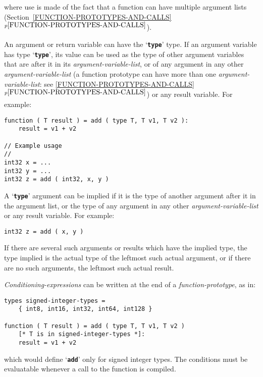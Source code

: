 \documentclass[12pt]{article}
\newcommand{\TT}[1]{{\tt \bfseries #1}}
\newcommand{\itemref}[1]{\ref{#1}$^{p\pageref{#1}}$}
\newenvironment{indpar}[1][0.3in]%
	{\begin{list}{}%
		     {\setlength{\itemsep}{0in}%
		      \setlength{\topsep}{0in}%
		      \setlength{\parsep}{1ex}%
		      \setlength{\labelwidth}{#1}%
		      \setlength{\leftmargin}{#1}%
		      \addtolength{\leftmargin}{\labelsep}}%
	 \item}%
	{\end{list}}
\begin{document}
where use is made of the fact that a function can have multiple
argument lists (Section~\itemref{FUNCTION-PROTOTYPES-AND-CALLS}).

An argument or return variable can have the `\TT{type}' type.
If an argument variable has type `\TT{type}', its value can be used as the
type of other argument variables that are
after it in its {\em argument-variable-list},
or of any argument in any other {\em argument-variable-list}
(a function prototype can have more than one {\em argument-variable-list}:
see \itemref{FUNCTION-PROTOTYPES-AND-CALLS})
or any
result variable.  For example:

\begin{indpar}\begin{verbatim}
function ( T result ) = add ( type T, T v1, T v2 ):
    result = v1 + v2

// Example usage
//
int32 x = ...
int32 y = ...
int32 z = add ( int32, x, y )
\end{verbatim}\end{indpar}

A `\TT{type}' argument can be implied if it is the type of another argument
after it in the argument list, or the type of
any argument in any other {\em argument-variable-list}
or any result variable.  For example:

\begin{indpar}\begin{verbatim}
int32 z = add ( x, y )
\end{verbatim}\end{indpar}

If there are several such arguments or results which have the implied
type, the type implied is the actual type of the leftmost such
actual argument, or if there are no such arguments,
the leftmost such actual result.

{\em Conditioning-expressions}
can be written at the end of a {\em function-prototype},
as in:
\begin{indpar}\begin{verbatim}
types signed-integer-types =
    { int8, int16, int32, int64, int128 }

function ( T result ) = add ( type T, T v1, T v2 )
    [* T is in signed-integer-types *]:
    result = v1 + v2
\end{verbatim}\end{indpar}

which would define `\TT{add}' only for signed integer types.
The conditions must be evaluatable whenever a call to the
function is compiled.
\end{document}
